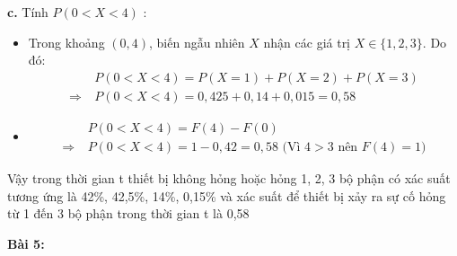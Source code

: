 \documentclass[12pt]{article}
\begin{document}
\begin{itemize}
    \textbf{c.}   Tính $ P(0 < X < 4)$ :
    \begin{itemize}
        \item {} Trong khoảng $(0, 4)$, biến ngẫu nhiên $X$ nhận các giá trị $X \in \{1, 2, 3\}$. Do đó:
        \begin{align*}
            & P(0 < X < 4) = P(X = 1) + P(X = 2) + P(X = 3) \\
            \Rightarrow\ & P(0 < X < 4) = 0,425 + 0,14 + 0,015 = 0,58
        \end{align*}
        \item {}
        \begin{align*}
            & P(0 < X < 4) = F(4) - F(0)  \\
            \Rightarrow\ & P(0 < X < 4) = 1 - 0,42 = 0,58 \text{  (Vì $4 > 3$ nên $F(4)=1$)}
        \end{align*}
    \end{itemize}
    
    Vậy trong thời gian t thiết bị không hỏng hoặc hỏng 1, 2, 3 bộ phận có xác suất tương ứng là 42\%, 42,5\%, 14\%, 0,15\% và xác suất để thiết bị xảy ra sự cố hỏng từ 1 đến 3 bộ phận trong thời gian t là 0,58
    
\end{itemize}

\clearpage

\textbf{Bài 5:}
\end{document}
